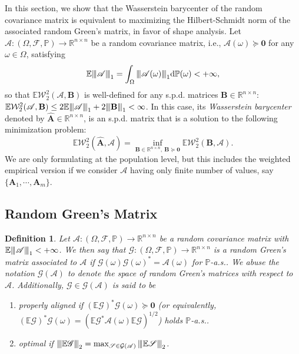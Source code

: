 \documentclass[noinfoline]{imsart}\setcounter{tocdepth}{2}
\renewcommand{\b}[1]{\mathbb{#1}} %
\newcommand{\m}[1]{\mathbf{#1}} %
\newcommand{\s}[1]{\mathscr{#1}} %
\renewcommand{\c}[1]{\mathcal{#1}} %
\newcommand{\rd}{\mathrm{d}} %
\newcommand{\vertiii}[1]{{\left\vert\kern-0.25ex\left\vert\kern-0.25ex\left\vert #1 
    \right\vert\kern-0.25ex\right\vert\kern-0.25ex\right\vert}} %
\newcommand{\vertii}[1]{{\vert\kern-0.25ex\vert\kern-0.25ex\vert #1 
    \vert\kern-0.25ex\vert\kern-0.25ex\vert}} %
\theoremstyle{plain}
\newtheorem{definition}{Definition}[section]
\begin{document}
In this section, we show that the Wasserstein barycenter of the random covariance matrix is equivalent to maximizing the Hilbert-Schmidt norm of the associated random Green's matrix, in favor of shape analysis. Let $\s{A}: (\Omega, \s{F}, \b{P}) \to \b{R}^{n \times n}$ be a random covariance matrix, i.e., $\s{A}(\omega) \succeq \m{0}$ for any $\omega \in \Omega$, satisfying
\begin{align*}
    \b{E} \vertiii{\s{A}}_{1} =  \int_{\Omega} \vertiii{\s{A}(\omega)}_{1} \rd \b{P}(\omega) < +\infty,
\end{align*}
so that $\b{E} \c{W}_{2}^{2}(\s{A}, \m{B})$ is well-defined for any s.p.d. matrices $\m{B} \in \b{R}^{n \times n}$: $\b{E} \c{W}_{2}^{2}(\s{A}, \m{B}) \le 2 \b{E} \vertiii{\s{A}}_{1} + 2 \vertiii{\m{B}}_{1} < \infty$. In this case, its \emph{Wasserstein barycenter} denoted by $\hat{\m{A}} \in \b{R}^{n \times n}$, is an s.p.d. matrix that is a solution to the following minimization problem:
\begin{equation*}
    \b{E} \c{W}_{2}^{2}(\hat{\m{A}}, \s{A}) = \inf_{\m{B} \in \b{R}^{n \times n}, \ \m{B} \succeq \m{0}}  \b{E} \c{W}_{2}^{2}(\m{B}, \s{A}).
\end{equation*}
We are only formulating at the population level, but this includes the weighted empirical version if we consider $\s{A}$ having only finite number of values, say $\{\m{A}_{1}, \cdots, \m{A}_{m}\}$.

\subsection{Random Green's Matrix}\label{ssec:rand:Green}

\begin{definition}\label{def:opt:aligned}
Let $\s{A}: (\Omega, \s{F}, \b{P}) \to \b{R}^{n \times n}$ be a random covariance matrix with $\b{E} \vertiii{\s{A}}_{1} < +\infty$. We then say that $\s{G}: (\Omega, \s{F}, \b{P}) \to \b{R}^{n \times n}$ is a \emph{random Green's matrix} associated to $\s{A}$ if $\s{G}(\omega) \s{G}(\omega)^{*} = \s{A}(\omega)$ for $\b{P}$-a.s.. We abuse the notation $\c{G}(\s{A})$ to denote the space of random Green's matrices with respect to $\s{A}$.  Additionally, $\s{G} \in \c{G}(\s{A})$ is said to be
\begin{enumerate}[leftmargin = *]
    \item \emph{properly aligned} if $(\b{E} \s{G})^{*} \s{G}(\omega) \succeq \m{0}$ (or equivalently, $(\b{E} \s{G})^{*} \s{G}(\omega) = (\b{E} \s{G}^{*} \s{A}(\omega) \b{E} \s{G})^{1/2}$) holds $\b{P}$-a.s..
    \item \emph{optimal} if $\vertii{\b{E} \s{G}}_{2} = \max_{\s{S} \in \c{G}(\s{A})} \vertii{\b{E} \s{S}}_{2}$.
\end{enumerate}
\end{definition}
\end{document}
